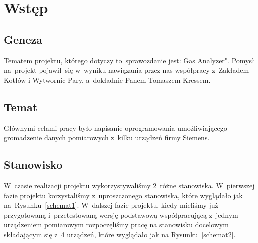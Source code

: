 \section{Wstęp}

\subsection{Geneza}
Tematem projektu, którego dotyczy to~sprawozdanie jest: Gas Analyzer". Pomysł na~projekt pojawił~się w~wyniku nawiązania przez nas współpracy z~Zakładem Kotłów i Wytwornic Pary, a~dokładnie Panem Tomaszem Kressem.

\subsection{Temat}
Głównymi celami pracy było napisanie oprogramowania umożliwiającego gromadzenie danych pomiarowych z~kilku urządzeń firmy Siemens.

\subsection{Stanowisko}
W~czasie realizacji projektu wykorzystywaliśmy 2~różne stanowiska. W~pierwszej fazie projektu korzystaliśmy z~uproszczonego stanowiska, które wyglądało jak na~Rysunku~\ref{schemat1}. W~dalszej fazie projektu, kiedy mieliśmy już przygotowaną i~przetestowaną wersję podstawową współpracującą z~jednym urządzeniem pomiarowym rozpoczęliśmy pracę na stanowisku docelowym składającym się z~4 urządzeń, które wyglądało jak na Rysunku~\ref{schemat2}.
